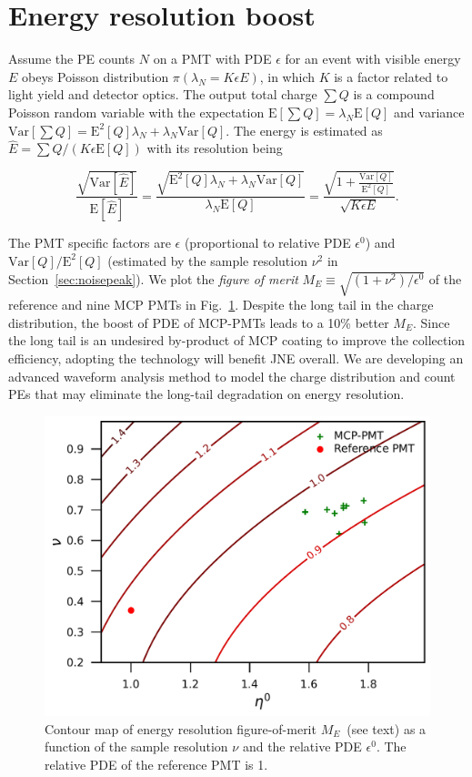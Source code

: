 \section{Energy resolution boost}
\label{Result}
Assume the PE counts $N$ on a PMT with PDE $\epsilon$ for an event with visible energy $E$ obeys Poisson distribution $\pi(\lambda_N=K\epsilon E)$, in which $K$ is a factor related to light yield and detector optics. The output total charge $\sum{Q}$ is a compound Poisson random variable with the expectation $\mathrm{E}[\sum{Q}]=\lambda_N\mathrm{E}[Q]$ and variance $\mathrm{Var}[\sum{Q}]=\mathrm{E}^2[Q]\lambda_N+\lambda_N\mathrm{Var}[Q]$. The energy is estimated as $\hat{E}=\sum{Q}/(K\epsilon\mathrm{E}[Q])$ with its resolution being

\begin{equation}
    \frac{\sqrt{\mathrm{Var}[\hat{E}]}}{\mathrm{E}[\hat{E}]}=\frac{\sqrt{\mathrm{E}^2[Q]\lambda_N+\lambda_N\mathrm{Var}[Q]}}{\lambda_N\mathrm{E}[Q]}=\frac{\sqrt{1+\frac{\mathrm{Var}[Q]}{\mathrm{E}^2[Q]}}}{\sqrt{K\epsilon E}}.
\end{equation}

The PMT specific factors are $\epsilon$ (proportional to relative PDE $\epsilon^0$) and $\mathrm{Var}[Q]/ \mathrm{E}^2[Q]$ (estimated by the sample resolution $\nu^2$ in Section~\ref{sec:noisepeak}).  We plot the \emph{figure of merit} $M_{E}\equiv\sqrt{({1+\nu^2})/{\epsilon^0}}$ of the reference and nine MCP PMTs in Fig.~\ref{fig:EnergyResolution}. Despite the long tail in the charge distribution, the boost of PDE of MCP-PMTs leads to a 10\% better $M_{E}$.  Since the long tail is an undesired by-product of MCP coating to improve the collection efficiency, adopting the technology will benefit JNE overall.  We are developing an advanced waveform analysis method to model the charge distribution and count PEs that may eliminate the long-tail degradation on energy resolution.

\begin{figure}[!htbp]
    \centering
    \includegraphics[width=\MF\textwidth]{figures/result/resolution.pdf}
    \caption{Contour map of energy resolution figure-of-merit $M_{E}$~(see text) as a function of the sample resolution $\nu$ and the relative PDE $\epsilon^0$. The relative PDE of the reference PMT is 1.}
    \label{fig:EnergyResolution}
\end{figure}
